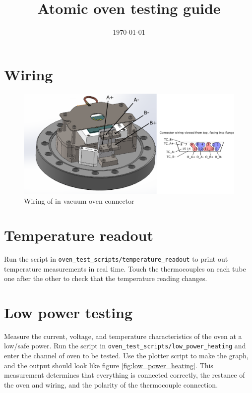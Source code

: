 \documentclass{article}
\begin{document}
\title{Atomic oven testing guide}
\date{\today}

\maketitle

\section{Wiring}

\begin{figure}[H]
    \center
    \includegraphics[scale=1]{figures/baseflange_wiring.pdf} 
    \caption{Wiring of in vacuum oven connector}
    \label{fig:baseflange_wiring}
\end{figure}

\section{Temperature readout}
Run the script in \texttt{oven\_test\_scripts/temperature\_readout} to print out temperature measurements in real time. Touch the thermocouples on each tube one after the other to check that the temperature reading changes.

\clearpage
\section{Low power testing}
Measure the current, voltage, and temperature characteristics of the oven at a low/safe power. Run the script in \texttt{oven\_test\_scripts/low\_power\_heating} and enter the channel of oven to be tested. Use the plotter script to make the graph, and the output should look like figure \ref{fig:low_power_heating}.
This measurement determines that everything is connected correctly, the restance of the oven and wiring, and the polarity of the thermocouple connection.
\end{document}
